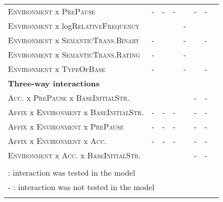 \begin{table}[H]
\begin{center}
{\begin{tabular}{llrrrrrr}
		\textsc{Environment} x \textsc{PrePause}  & -&-&-&\checkmark&-&-\\
		
	
	\textsc{Environment} x log\textsc{RelativeFrequency}  & \checkmark&\checkmark&\checkmark&-&\checkmark&\checkmark\\
	\textsc{Environment} x \textsc{SemanticTrans.Binary}  & -&\checkmark&\checkmark&-&\checkmark&-\\
	\textsc{Environment} x \textsc{SemanticTrans.Rating}  &- &\checkmark&\checkmark&-&\checkmark&\checkmark\\
	\textsc{Environment} x \textsc{TypeOfBase}  & -&\checkmark&\checkmark&-&\checkmark&-\\
	
	\hline 

		 \textbf{Three-way interactions} & &&&& &\\
		 \hline
		 \textsc{Acc.} x \textsc{PrePause} x \textsc{BaseInitialStr.} & \checkmark&\checkmark&\checkmark&\checkmark&-&-\\
		 \textsc{Affix} x \textsc{Environment} x \textsc{BaseInitialStr.} & -&-&-&\checkmark&- &-\\
		 \textsc{Affix} x \textsc{Environment} x \textsc{PrePause} & -&-&-&\checkmark&- &-\\
		 \textsc{Affix} x \textsc{Environment} x \textsc{Acc.} & -&-&-&\checkmark&- &-\\
		 
		 	\textsc{Environment} x \textsc{Acc.} x \textsc{BaseInitialStr.}  & \checkmark&\checkmark&\checkmark&\checkmark&-&-\\
	 	
		 \hline
	\\
	\multicolumn{6}{l}{\small \checkmark \hspace*{0.2cm}: interaction was tested in the model} & \\			
	\multicolumn{6}{l}{\small - \hspace*{0.45cm}: interaction was not tested in the model} & \\			
	&
			\end{tabular}
}
\end{center}

\end{table}






